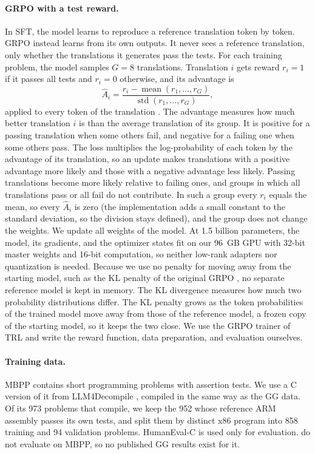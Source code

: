 \documentclass{article}
\begin{document}
\paragraph{GRPO with a test reward.}
In SFT, the model learns to reproduce a reference translation token by token. GRPO instead learns from its own outputs. It never sees a reference translation, only whether the translations it generates pass the tests. For each training problem, the model samples $G=8$ translations. Translation $i$ gets reward $r_i=1$ if it passes all tests and $r_i=0$ otherwise, and its advantage is
\begin{equation}
  \hat{A}_i = \frac{r_i - \operatorname{mean}(r_1,\dots,r_G)}{\operatorname{std}(r_1,\dots,r_G)},
\end{equation}
applied to every token of the translation \citep{deepseekmath}. The advantage measures how much better translation $i$ is than the average translation of its group. It is positive for a passing translation when some others fail, and negative for a failing one when some others pass. The loss multiplies the log-probability of each token by the advantage of its translation, so an update makes translations with a positive advantage more likely and those with a negative advantage less likely. Passing translations become more likely relative to failing ones, and groups in which all translations pass or all fail do not contribute. In such a group every $r_i$ equals the mean, so every $\hat{A}_i$ is zero (the implementation adds a small constant to the standard deviation, so the division stays defined), and the group does not change the weights. We update all weights of the model. At 1.5 billion parameters, the model, its gradients, and the optimizer states fit on our 96~GB GPU with 32-bit master weights and 16-bit computation, so neither low-rank adapters nor quantization is needed. Because we use no penalty for moving away from the starting model, such as the KL penalty of the original GRPO \citep{deepseekmath}, no separate reference model is kept in memory. The KL divergence measures how much two probability distributions differ. The KL penalty grows as the token probabilities of the trained model move away from those of the reference model, a frozen copy of the starting model, so it keeps the two close. We use the GRPO trainer of TRL \citep{trl} and write the reward function, data preparation, and evaluation ourselves.

\paragraph{Training data.}
MBPP \citep{mbpp} contains short programming problems with assertion tests. We use a C version of it from LLM4Decompile \citep{llm4decompile}, compiled in the same way as the GG data. Of its 973 problems that compile, we keep the 952 whose reference ARM assembly passes its own tests, and split them by distinct x86 program into 858 training and 94 validation problems. HumanEval-C is used only for evaluation. \citet{gg} do not evaluate on MBPP, so no published GG results exist for it. 
\end{document}
